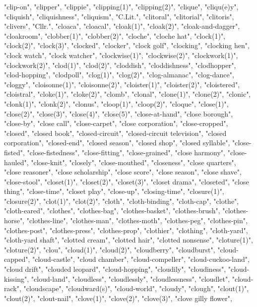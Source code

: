 "clip-on",
"clipper",
"clippie",
"clipping(1)",
"clipping(2)",
"clique",
"cliqu(e)y",
"cliquish",
"cliquishness",
"cliquism",
"C.Lit.",
"clitoral",
"clitorial",
"clitoris",
"clivers",
"Cllr.",
"cloaca",
"cloacal",
"cloak(1)",
"cloak(2)",
"cloak-and-dagger",
"cloakroom",
"clobber(1)",
"clobber(2)",
"cloche",
"cloche hat",
"clock(1)",
"clock(2)",
"clock(3)",
"clocked",
"clocker",
"clock golf",
"clocking",
"clocking hen",
"clock watch",
"clock watcher",
"clockwise(1)",
"clockwise(2)",
"clockwork(1)",
"clockwork(2)",
"clod(1)",
"clod(2)",
"cloddish",
"cloddishness",
"clodhopper",
"clod-hopping",
"clodpoll",
"clog(1)",
"clog(2)",
"clog-almanac",
"clog-dance",
"cloggy",
"cloisonne(1)",
"cloisonne(2)",
"cloister(1)",
"cloister(2)",
"cloistered",
"cloistral",
"cloke(1)",
"cloke(2)",
"clomb",
"clonal",
"clone(1)",
"clone(2)",
"clonic",
"clonk(1)",
"clonk(2)",
"clonus",
"cloop(1)",
"cloop(2)",
"cloque",
"close(1)",
"close(2)",
"close(3)",
"close(4)",
"close(5)",
"close-at-hand",
"close borough",
"close-by",
"close call",
"close-carpet",
"close corporation",
"close-cropped",
"closed",
"closed book",
"closed-circuit",
"closed-circuit television",
"closed corporation",
"closed-end",
"closed season",
"closed shop",
"closed syllable",
"close-fisted",
"close-fistedness",
"close-fitting",
"close-grained",
"close harmony",
"close-hauled",
"close-knit",
"closely",
"close-mouthed",
"closeness",
"close quarters",
"close reasoner",
"close scholarship",
"close score",
"close season",
"close shave",
"close-stool",
"closet(1)",
"closet(2)",
"closet(3)",
"closet drama",
"closeted",
"close thing",
"close-time",
"closet play",
"close-up",
"closing-time",
"closure(1)",
"closure(2)",
"clot(1)",
"clot(2)",
"cloth",
"cloth-binding",
"cloth-cap",
"clothe",
"cloth-eared",
"clothes",
"clothes-bag",
"clothes-basket",
"clothes-brush",
"clothes-horse",
"clothes-line",
"clothes-man",
"clothes-moth",
"clothes-peg",
"clothes-pin",
"clothes-post",
"clothes-press",
"clothes-prop",
"clothier",
"clothing",
"cloth-yard",
"cloth-yard shaft",
"clotted cream",
"clotted hair",
"clotted nonsense",
"cloture(1)",
"cloture(2)",
"clou",
"cloud(1)",
"cloud(2)",
"cloudberry",
"cloudburst",
"cloud-capped",
"cloud-castle",
"cloud chamber",
"cloud-compeller",
"cloud-cuckoo-land",
"cloud drift",
"clouded leopard",
"cloud-hopping",
"cloudily",
"cloudiness",
"cloud-kissing",
"cloud-land",
"cloudless",
"cloudlessly",
"cloudlessness",
"cloudlet",
"cloud-rack",
"cloudscape",
"cloudward(s)",
"cloud-world",
"cloudy",
"clough",
"clout(1)",
"clout(2)",
"clout-nail",
"clove(1)",
"clove(2)",
"clove(3)",
"clove gilly flower",
